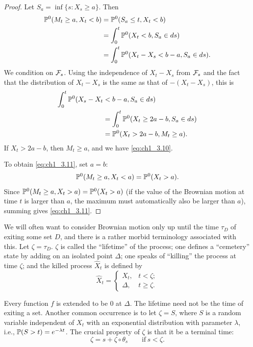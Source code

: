 \begin{proof}
Let $S_a = \inf\{s : X_s \geq a\}$. Then
\begin{align}\label{eq:ch1_3.12}
    \P^0(M_t \geq a, X_t < b) &= \P^0(S_a \leq t, X_t < b) \\
    &= \int_0^t \P^0(X_t < b, S_a \in ds) \notag \\
    &= \int_0^t \P^0(X_t - X_s < b - a, S_a \in ds). \notag
\end{align}
We condition on $\FC_s$. Using the independence of $X_t - X_s$ from $\FC_s$ and the fact that the distribution of $X_t - X_s$ is the same as that of $-(X_t - X_s)$, this is
\mpagebreak
\begin{align}\label{eq:ch1_3.13}
    \int_0^t \P^0(X_s - X_t &< b - a, S_a \in ds) \\
    &=\int_0^t\P^0(X_t \geq 2a-b, S_a \in ds) \notag \\
    &= \P^0(X_t > 2a - b, M_t \geq a). \notag
\end{align}
If $X_t > 2a - b$, then $M_t \geq a$, and we have \eqref{eq:ch1_3.10}.

To obtain \eqref{eq:ch1_3.11}, set $a = b$:
\[
    \P^0(M_t \geq a, X_t < a) = \P^0(X_t > a).
\]
Since $\P^0(M_t \geq a, X_t > a) = \P^0(X_t > a)$ (if the value of the Brownian motion at time $t$ is larger than $a$, the maximum must automatically also be larger than $a$), summing gives \eqref{eq:ch1_3.11}.
\end{proof}


We will often want to consider Brownian motion only up until the time $\tau_D$ of exiting some set $D$, and there is a rather morbid terminology associated with this. Let $\zeta = \tau_D$. $\zeta$ is called the ``lifetime'' of the process; one defines a ``cemetery'' state by adding on an isolated point $\Delta$; one speaks of ``killing'' the process at time $\zeta$; and the killed process $\widehat{X}_t$ is defined by
\begin{equation}\label{eq:ch1_3.14}
    \widehat{X}_t = \begin{cases}
    X_t, & t < \zeta;\\
    \Delta, & t \geq \zeta.
    \end{cases}
\end{equation}

Every function $f$ is extended to be $0$ at $\Delta$. The lifetime need not be the time of exiting a set. Another common occurrence is to let $\zeta = S$, where $S$ is a random variable independent of $X_t$ with an exponential distribution with parameter $\lambda$, i.e., $\P(S > t) = e^{-\lambda t}$. The crucial property of $\zeta$ is that it be a terminal time:
\begin{equation}\label{eq:ch1_3.15}
    \zeta = s + \zeta \circ \theta_s \qquad \text{if}~s < \zeta.
\end{equation}

